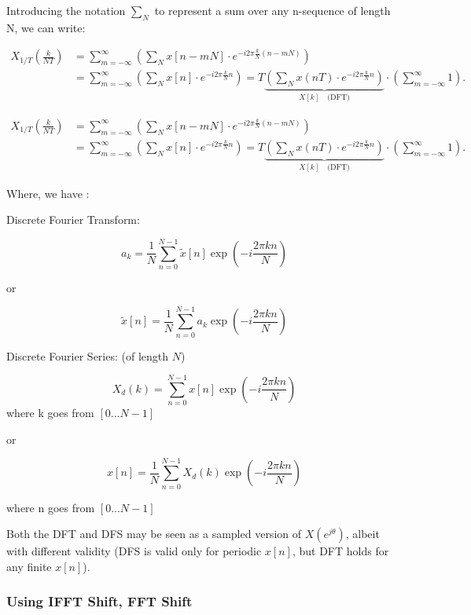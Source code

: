 \documentclass[11pt]{article}
\begin{document}
Introducing the notation \(\sum _{N}\) to represent a sum over any
n-sequence of length N, we can write:

\[ \begin{aligned}X_{1/T}\left({\frac {k}{NT}}\right)&=\sum _{m=-\infty }^{\infty }\left(\sum _{N}x[n-mN]\cdot e^{-i2\pi {\frac {k}{N}}(n-mN)}\right)\\&=\sum _{m=-\infty }^{\infty }\left(\sum _{N}x[n]\cdot e^{-i2\pi {\frac {k}{N}}n}\right)=T\underbrace {\left(\sum _{N}x(nT)\cdot e^{-i2\pi {\frac {k}{N}}n}\right)} _{X[k]\quad {\text{(DFT)}}}\cdot \left(\sum _{m=-\infty }^{\infty }1\right).\end{aligned} \]

\[ \begin{aligned}X_{1/T}\left({\frac {k}{NT}}\right)&=\sum _{m=-\infty }^{\infty }\left(\sum _{N}x[n-mN]\cdot e^{-i2\pi {\frac {k}{N}}(n-mN)}\right)\\&=\sum _{m=-\infty }^{\infty }\left(\sum _{N}x[n]\cdot e^{-i2\pi {\frac {k}{N}}n}\right)=T\underbrace {\left(\sum _{N}x(nT)\cdot e^{-i2\pi {\frac {k}{N}}n}\right)} _{X[k]\quad {\text{(DFT)}}}\cdot \left(\sum _{m=-\infty }^{\infty }1\right).\end{aligned} \]

Where, we have :

Discrete Fourier Transform:

\[ a_k = \frac{1}{N} \sum_{n=0}^{N-1} \tilde{x}[n]\exp(−i \frac{2\pi kn}{N}) \]

or

\[ \tilde{x}[n] = \frac{1}{N} \sum_{n=0}^{N-1} a_k \exp(−i \frac{2\pi kn}{N}) \]

Discrete Fourier Series: (of length \(N\))

\[ X_d (k) = \sum_{n=0}^{N-1} {x}[n]\exp(−i \frac{2\pi kn}{N})\] where k
goes from \([0...N-1]\)

or

\[ {x}[n] = \frac{1}{N} \sum_{n=0}^{N-1}X_d(k)\exp(−i \frac{2\pi kn}{N}) \]

where n goes from \([0...N-1]\)

Both the DFT and DFS may be seen as a sampled version of
\(X(e^{j\theta})\), albeit with different validity (DFS is valid only
for periodic \(x[n]\), but DFT holds for any finite \(x[n]\)).

\subsubsection{Using IFFT Shift, FFT
Shift}\label{using-ifft-shift-fft-shift}
\end{document}

